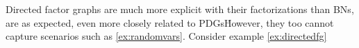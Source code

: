 \documentclass{article}
\newcommand{\MN}{PDG}
\newcommand{\MNs}{\MN s}
\numberwithin{equation}{section}
\begin{document}
	Directed factor graphs are much more explicit with their factorizations than BNs, are as expected, even more closely related to \MNs\. However, they too cannot capture scenarios such as \cref{ex:randomvars}. Consider example \ref{ex:directedfg}
	
	\begin{example}\label{ex:directedfg}
	\end{example}

	
	

		
	
\end{document}
